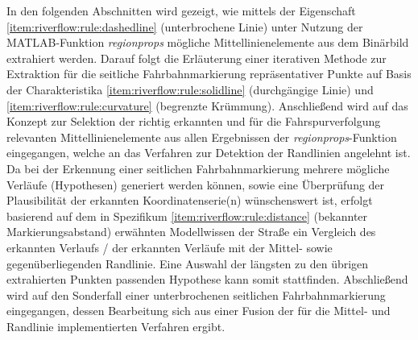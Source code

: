 In den folgenden Abschnitten wird gezeigt, wie mittels der Eigenschaft \ref{item:riverflow:rule:dashedline} (unterbrochene Linie) unter Nutzung der MATLAB-Funktion \emph{regionprops} mögliche Mittellinienelemente aus dem Binärbild extrahiert werden. Darauf folgt die Erläuterung einer iterativen Methode zur Extraktion für die seitliche Fahrbahnmarkierung repräsentativer Punkte auf Basis der Charakteristika \ref{item:riverflow:rule:solidline} (durchgängige Linie) und \ref{item:riverflow:rule:curvature} (begrenzte Krümmung). Anschließend wird auf das Konzept zur Selektion der richtig erkannten und für die Fahrspurverfolgung relevanten Mittellinienelemente aus allen Ergebnissen der \emph{regionprops}-Funktion eingegangen, welche an das Verfahren zur Detektion der Randlinien angelehnt ist. Da bei der Erkennung einer seitlichen Fahrbahnmarkierung mehrere mögliche Verläufe (\glqq Hypothesen\grqq ) generiert werden können, sowie eine Überprüfung der Plausibilität der erkannten Koordinatenserie(n) wünschenswert ist, erfolgt basierend auf dem in Spezifikum \ref{item:riverflow:rule:distance} (bekannter Markierungsabstand) erwähnten Modellwissen der Straße ein Vergleich des erkannten Verlaufs / der erkannten Verläufe mit der Mittel- sowie gegenüberliegenden Randlinie. Eine Auswahl der längsten zu den übrigen extrahierten Punkten passenden Hypothese kann somit stattfinden. Abschließend wird auf den Sonderfall einer unterbrochenen seitlichen Fahrbahnmarkierung eingegangen, dessen Bearbeitung sich aus einer Fusion der für die Mittel- und Randlinie implementierten Verfahren ergibt.




